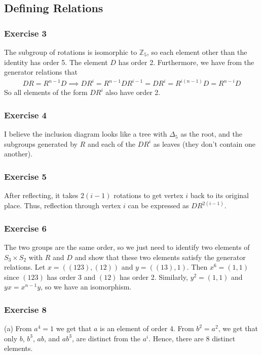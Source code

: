 \subsection{Defining Relations}

\subsubsection{Exercise 3}
The subgroup of rotations is isomorphic to $\mathbb{Z}_5$, so each element other than the identity has order 5.
The element $D$ has order 2. Furthermore, we have from the generator relations that
\begin{align*}
        DR = R^{n-1}D \implies DR^i = R^{n-1} DR^{i-1} = DR^i = R^{i(n - 1)}D = R^{n - i}D
\end{align*}
So all elements of the form $DR^i$ also have order 2.

\subsubsection{Exercise 4}
I believe the inclusion diagram looks like a tree with $\Delta_5$ as the root, and the subgroups generated by
$R$ and each of the  $DR^i$ as leaves (they don't contain one another).

\subsubsection{Exercise 5}
After reflecting, it takes $2(i - 1)$ rotations to get vertex $i$ back to its original place. Thus,
reflection through vertex $i$ can be expressed as $DR^{2(i-1)}$.

\subsubsection{Exercise 6}
The two groups are the same order, so
we just need to identify two elements of $S_3 \times S_2$ with $R$ and $D$ and show that these two elements
satisfy the generator relations. Let $x = ((1 2 3), (1 2))$ and $y = ((1 3), 1)$. Then $x^6 = (1, 1)$ since
$(1 2 3)$ has order 3 and $(1 2)$ has order 2. Similarly, $y^2 = (1, 1)$ and $yx = x^{n - 1}y$, so we have
an isomorphism.

\subsubsection{Exercise 8}
(a) From $a^4 = 1$ we get that $a$ is an element of order  4. From $b^2 = a^2$, we get that only $b$, $b^3$,
$ab$, and $ab^3$, are distinct from the $a^i$. Hence, there are 8 distinct elements.

